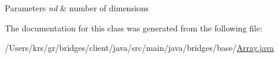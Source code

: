 \begin{DoxyParams}{Parameters}
{\em nd} & number of dimensions \\
\hline
\end{DoxyParams}


The documentation for this class was generated from the following file\+:\begin{DoxyCompactItemize}
\item 
/\+Users/krs/gr/bridges/client/java/src/main/java/bridges/base/\hyperlink{_array_8java}{Array.\+java}\end{DoxyCompactItemize}
